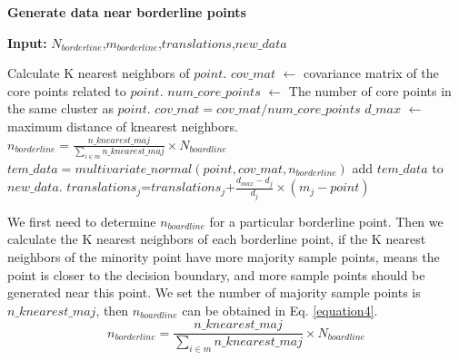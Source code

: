 \documentclass[ida]{iosart2x}
\begin{document}
\textbf{Generate data near borderline points}
\begin{algorithm}[tb]
  \caption{$generate\_borderline$}
  \label{alg3}
  \hspace*{0.02in} {\bf Input:} %
   $N_{borderline}$,$m_{borderline}$,$translations$,$new\_data$
  \begin{algorithmic}
      \State Calculate K nearest neighbors of $point$.
      \State $cov\_mat$ $\leftarrow$ covariance matrix of the core points related to $point$.
      \State $num\_core\_points$ $\leftarrow$ The number of core points in the same cluster as $point$.
      \State $cov\_mat=cov\_mat/num\_core\_points$
      \State $d\_max$ $\leftarrow$ maximum distance of knearest neighbors.
  　　 \State $n_{borderline}=\frac{n\_knearest\_maj}{\sum_{i\in m} n\_knearest\_maj}\times N_{boardline}$
      \State $tem\_data=multivariate\_normal(point,cov\_mat,n_{borderline})$
      \State add $tem\_data$ to $new\_data$.
        \State $translations_j$=$translations_j$+$\frac{d_{max}-d_{j}}{d_{j}}\times (m_{j}-point)$
      \EndFor
  \EndFor
  \end{algorithmic}
\end{algorithm}
We first need to determine $n_{boardline}$ for a particular borderline point.
Then we calculate the K nearest neighbors of each borderline point, 
if the K nearest neighbors of the minority point have more majority sample points, 
means the point 
is closer to the decision boundary, and more sample points should be generated near this point.
We set the number of majority sample points is $n\_knearest\_maj$,
then $n_{boardline}$ can be obtained in Eq. \ref{equation4}.
\begin{equation}
  \label{equation4}
  n_{borderline}=\frac{n\_knearest\_maj}{\sum_{i\in m} n\_knearest\_maj}\times N_{boardline}
\end{equation}
\end{document}
